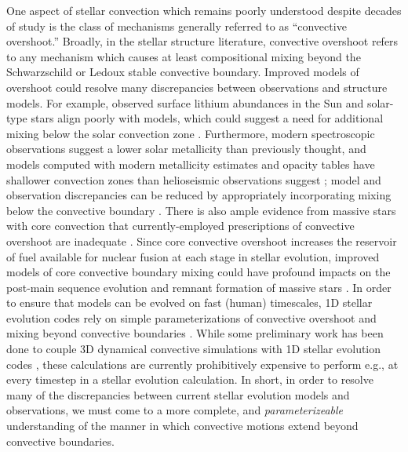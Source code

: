 \documentclass{aastex631}
\begin{document}
One aspect of stellar convection which remains poorly understood despite decades of study is the class of mechanisms generally referred to as ``convective overshoot.''
Broadly, in the stellar structure literature, convective overshoot refers to any mechanism which causes at least compositional mixing beyond the Schwarzschild or Ledoux stable convective boundary.
Improved models of overshoot could resolve many discrepancies between observations and structure models.
For example, observed surface lithium abundances in the Sun and solar-type stars align poorly with models, which could suggest a need for additional mixing below the solar convection zone \citep{pinsonneault1997, carlos_etal_2019, dumont_etal_2021}.
Furthermore, modern spectroscopic observations suggest a lower solar metallicity than previously thought, and models computed with modern metallicity estimates and opacity tables have shallower convection zones than helioseismic observations suggest \citep{basu_antia_2004, bahcall_etal_2005, vinyoles_etal_2017, asplund_etal_2021}; model and observation discrepancies can be reduced by appropriately incorporating mixing below the convective boundary \citep{christensen-dalsgaard_etal_2011}.
There is also ample evidence from massive stars with core convection that currently-employed prescriptions of convective overshoot are inadequate \citep{claret_torres_2018, jermyn_etal_2018, viani_basu_2020, martinet_etal_2021, pedersen_etal_2021}.
Since core convective overshoot increases the reservoir of fuel available for nuclear fusion at each stage in stellar evolution, improved models of core convective boundary mixing could have profound impacts on the post-main sequence evolution and remnant formation of massive stars \citep{farmer_etal_2019, higgins_vink_2020}.
In order to ensure that models can be evolved on fast (human) timescales, 1D stellar evolution codes rely on simple parameterizations of convective overshoot and mixing beyond convective boundaries \citep{shaviv_salpeter_1973, maeder1975, herwig2000, paxton_etal_2011, paxton_etal_2013, paxton_etal_2018, paxton_etal_2019}.
While some preliminary work has been done to couple 3D dynamical convective simulations with 1D stellar evolution codes \citep{jorgensen_weiss_2019}, these calculations are currently prohibitively expensive to perform e.g., at every timestep in a stellar evolution calculation.
In short, in order to resolve many of the discrepancies between current stellar evolution models and observations, we must come to a more complete, and \emph{parameterizeable} understanding of the manner in which convective motions extend beyond convective boundaries.
\end{document}
